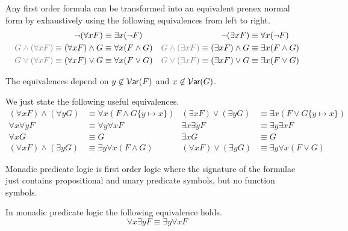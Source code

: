 \begin{lemma}
	Any first order formula can be transformed 
	into an equivalent prenex normal form 
	by exhaustively using the following equivalences from left to right.
	\begin{align*}
	\lnot(\forall x F) &\equiv \exists x (\lnot F)
	&
	\lnot(\exists x F) &\equiv \forall x (\lnot F)
	\\
	{\colG G \land (\forall x F) \equiv{}} (\forall x F) \land G &\equiv \forall x (F \land G)  
	&
	{\colG G \land (\exists x F) \equiv{}} (\exists x F) \land G &\equiv \exists x (F \land G)  
	\\
	{\colG G \lor (\forall x F) \equiv{}} (\forall x F) \lor G &\equiv \forall x (F \lor G) 
	&
	{\colG G \lor (\exists x F) \equiv{}} (\exists x F) \lor G &\equiv \exists x (F \lor G)
	\end{align*}
	\begin{remark}
		The equivalences depend on $y\not\in\operatorname{\mathcal{V}\mathsf{ar}}(F)$ and $x\not\in\operatorname{\mathcal{V}\mathsf{ar}}(G)$.
	\end{remark}
\end{lemma}

\begin{lemma}We just state the following useful equivalences.
	\begin{align*}
		(\forall x F) \land (\forall y G) &\equiv \forall x (F\land G\{y\mapsto x\})
		&
		(\exists x F) \lor (\exists y G) &\equiv \exists x (F\lor G\{y\mapsto x\})
		\\
		\forall x \forall y F &\equiv \forall y \forall x F
		&
		\exists x \exists y F &\equiv \exists y \exists x F
		\\
		\forall x G &\equiv G & \exists x G &\equiv G
		\\
		(\forall x F) \land (\exists y G) &\equiv \exists y \forall x (F\land G)
		&
		(\forall x F) \lor (\exists y G) &\equiv \exists y \forall x (F\lor G)
	\end{align*}
\end{lemma}

\begin{definition}
	Monadic predicate logic is first order logic 
	where the signature of the formulae just contains
	propositional and unary predicate symbols,
	but no function symbols.
\end{definition}

\begin{lemma}
	In monadic predicate logic the following equivalence holds.
	\[
		\forall x \exists y F \equiv \exists y \forall x F
	\]
	
\end{lemma}

